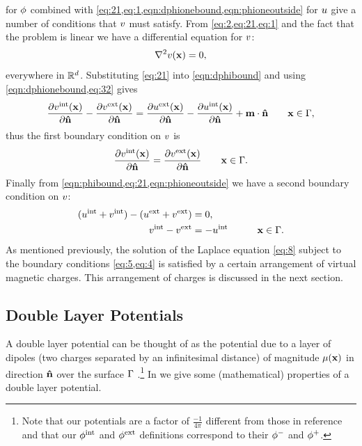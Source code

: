  for $\phi$ combined with \cref{eq:21,eq:1,eqn:dphionebound,eqn:phioneoutside} for $u$ give a number of conditions that $v$ must satisfy.
From \cref{eq:2,eq:21,eq:1} and the fact that the problem is linear we have a differential equation for $v$:
\begin{equation}
  \label{eq:8}
  \nabla^2 v(\boldsymbol{\mathrm{x}}) = 0,
\end{equation}
everywhere in $\mathbb{R}^d$.
Substituting \cref{eq:21} into \cref{eqn:dphibound} and using \cref{eqn:dphionebound,eq:32} gives
\begin{equation}
    \frac{\partial v^{\mathrm{int}}(\boldsymbol{\mathrm{x}})}{\partial \boldsymbol{\mathrm{\hat{n}}}} - \frac{\partial v^{\mathrm{ext}}(\boldsymbol{\mathrm{x}})}{\partial \boldsymbol{\mathrm{\hat{n}}}} =
    \frac{\partial u^{\mathrm{ext}}(\boldsymbol{\mathrm{x}})}{\partial \boldsymbol{\mathrm{\hat{n}}}} - \frac{\partial u^{\mathrm{int}}(\boldsymbol{\mathrm{x}})}{\partial \boldsymbol{\mathrm{\hat{n}}}}
    + \boldsymbol{\mathrm{m}} \cdot \boldsymbol{\mathrm{\hat{n}}} \qquad \boldsymbol{\mathrm{x}} \in {\Gamma},
\end{equation}
thus the first boundary condition on $v$ is
\begin{equation}
  \frac{\partial v^{\mathrm{int}}(\boldsymbol{\mathrm{x}})}{\partial \boldsymbol{\mathrm{\hat{n}}}} = \frac{\partial v^{\mathrm{ext}}(\boldsymbol{\mathrm{x}})}{\partial \boldsymbol{\mathrm{\hat{n}}}}  \qquad \boldsymbol{\mathrm{x}} \in {\Gamma}.
  \label{eq:5}
\end{equation}
Finally from \cref{eqn:phibound,eq:21,eqn:phioneoutside} we have a second boundary condition on $v$:
\begin{equation}
  \begin{aligned}
    (u^{\mathrm{int}} + v^{\mathrm{int}}) - (u^{\mathrm{ext}} + v^{\mathrm{ext}}) &= 0, \\
    v^{\mathrm{int}} - v^{\mathrm{ext}} &= - u^{\mathrm{int}} &\qquad \boldsymbol{\mathrm{x}} \in {\Gamma}.
    \label{eq:4}
  \end{aligned}
\end{equation}
As mentioned previously, the solution of the Laplace equation \cref{eq:8} subject to the boundary conditions \cref{eq:5,eq:4} is satisfied by a certain arrangement of virtual magnetic charges.
This arrangement of charges is discussed in the next section.

\subsection{Double Layer Potentials}
\label{sec:double-layer-potent}

A double layer potential can be thought of as the potential due to a layer of dipoles (\ie two charges separated by an infinitesimal distance) of magnitude $\mu(\boldsymbol{\mathrm{x}})$ in direction $\boldsymbol{\mathrm{\hat{n}}}$ over the surface ${\Gamma}$ \cite{Sternberg1946}.\footnote{Note that our potentials are a factor of $\frac{-1}{4 \pi}$ different from those in reference \cite{Sternberg1946} and that our $\phi^{\mathrm{int}}$ and $\phi^{\mathrm{ext}}$ definitions correspond to their $\phi^-$ and $\phi^+$.}
In  we give some (mathematical) properties of a double layer potential.

